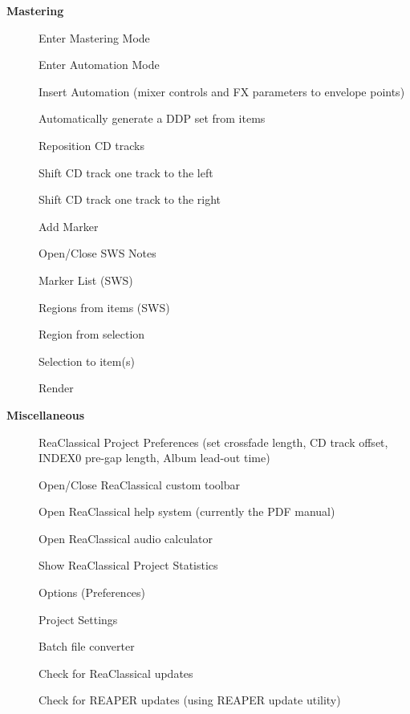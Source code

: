 \documentclass[10pt,american]{article}
\begin{document}
\textbf{Mastering}
\begin{description}
\item [{}] Enter Mastering Mode
\item [{}] Enter Automation Mode
\item [{}] Insert Automation (mixer controls and FX parameters to
envelope points)
\item [{}] Automatically generate a DDP set from items
\item [{}] Reposition CD tracks
\item [{\keys{\ctrl+\arrowkeyleft}}] Shift CD track one track to the left
\item [{\keys{\ctrl+\arrowkeyright}}] Shift CD track one track to the right
\item [{}] Add Marker 
\item [{}] Open/Close SWS Notes
\item [{}] Marker List (SWS) 
\item [{\keys{;}}] Regions from items (SWS) 
\item [{\keys{:}}] Region from selection 
\item [{\keys{/}}] Selection to item(s) 
\item [{}] Render 
\end{description}
\textbf{Miscellaneous }
\begin{description}
\item [{}] ReaClassical Project Preferences (set crossfade length, CD
track offset, INDEX0 pre-gap length, Album lead-out time)
\item [{}] Open/Close ReaClassical custom toolbar
\item [{}] Open ReaClassical help system (currently the PDF manual)
\item [{}] Open ReaClassical audio calculator
\item [{}] Show ReaClassical Project Statistics
\item [{}] Options (Preferences) 
\item [{}] Project Settings 
\item [{}] Batch file converter 
\item [{}] Check for ReaClassical updates
\item [{}] Check for REAPER updates (using REAPER update
utility)\pagebreak{}
\end{description}
\end{document}
